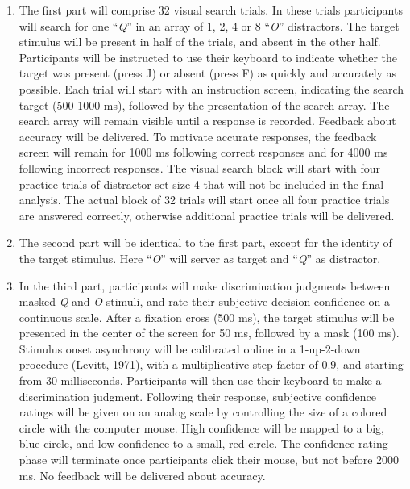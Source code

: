 \documentclass[
  english,
  man,floatsintext]{apa6}
\begin{document}
\begin{enumerate}
\def\labelenumi{\arabic{enumi}.}
\item
  The first part will comprise 32 visual search trials. In these trials participants will search for one \enquote{\emph{Q}} in an array of 1, 2, 4 or 8 \enquote{\emph{O}} distractors. The target stimulus will be present in half of the trials, and absent in the other half. Participants will be instructed to use their keyboard to indicate whether the target was present (press J) or absent (press F) as quickly and accurately as possible. Each trial will start with an instruction screen, indicating the search target (500-1000 ms), followed by the presentation of the search array. The search array will remain visible until a response is recorded. Feedback about accuracy will be delivered. To motivate accurate responses, the feedback screen will remain for 1000 ms following correct responses and for 4000 ms following incorrect responses. The visual search block will start with four practice trials of distractor set-size 4 that will not be included in the final analysis. The actual block of 32 trials will start once all four practice trials are answered correctly, otherwise additional practice trials will be delivered.
\item
  The second part will be identical to the first part, except for the identity of the target stimulus. Here \enquote{\emph{O}} will server as target and \enquote{\emph{Q}} as distractor.
\item
  In the third part, participants will make discrimination judgments between masked \emph{Q} and \emph{O} stimuli, and rate their subjective decision confidence on a continuous scale. After a fixation cross (500 ms), the target stimulus will be presented in the center of the screen for 50 ms, followed by a mask (100 ms). Stimulus onset asynchrony will be calibrated online in a 1-up-2-down procedure (Levitt, 1971), with a multiplicative step factor of 0.9, and starting from 30 milliseconds. Participants will then use their keyboard to make a discrimination judgment. Following their response, subjective confidence ratings will be given on an analog scale by controlling the size of a colored circle with the computer mouse. High confidence will be mapped to a big, blue circle, and low confidence to a small, red circle. The confidence rating phase will terminate once participants click their mouse, but not before 2000 ms. No feedback will be delivered about accuracy.
\end{enumerate}
\end{document}
